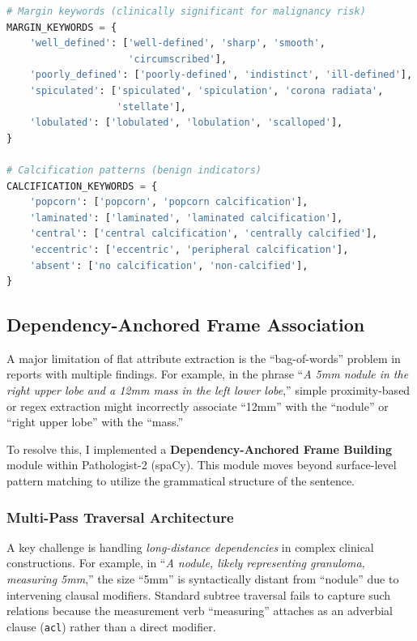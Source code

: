 \documentclass[12pt]{article}
\begin{document}
\begin{lstlisting}[language=Python, caption={Margin and calcification keyword dictionaries.}]
# Margin keywords (clinically significant for malignancy risk)
MARGIN_KEYWORDS = {
    'well_defined': ['well-defined', 'sharp', 'smooth', 
                     'circumscribed'],
    'poorly_defined': ['poorly-defined', 'indistinct', 'ill-defined'],
    'spiculated': ['spiculated', 'spiculation', 'corona radiata', 
                   'stellate'],
    'lobulated': ['lobulated', 'lobulation', 'scalloped'],
}

# Calcification patterns (benign indicators)
CALCIFICATION_KEYWORDS = {
    'popcorn': ['popcorn', 'popcorn calcification'],
    'laminated': ['laminated', 'laminated calcification'],
    'central': ['central calcification', 'centrally calcified'],
    'eccentric': ['eccentric', 'peripheral calcification'],
    'absent': ['no calcification', 'non-calcified'],
}
\end{lstlisting}

\subsection{Dependency-Anchored Frame Association}
\label{subsec:dependency-frames}

A major limitation of flat attribute extraction is the ``bag-of-words'' problem in reports with multiple findings. For example, in the phrase ``\textit{A 5mm nodule in the right upper lobe and a 12mm mass in the left lower lobe},'' simple proximity-based or regex extraction might incorrectly associate ``12mm'' with the ``nodule'' or ``right upper lobe'' with the ``mass.''

To resolve this, I implemented a \textbf{Dependency-Anchored Frame Building} module within Pathologist-2 (spaCy). This module moves beyond surface-level pattern matching to utilize the grammatical structure of the sentence.

\subsubsection{Multi-Pass Traversal Architecture}

A key challenge is handling \emph{long-distance dependencies} in complex clinical constructions. For example, in ``\textit{A nodule, likely representing granuloma, measuring 5mm},'' the size ``5mm'' is syntactically distant from ``nodule'' due to intervening clausal modifiers. Standard subtree traversal fails to capture such relations because the measurement verb ``measuring'' attaches as an adverbial clause (\texttt{acl}) rather than a direct modifier.
\end{document}
